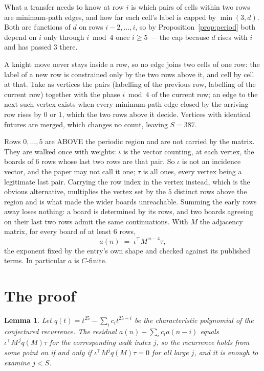 \documentclass[11pt,a4paper]{article}
\theoremstyle{plain}
\newtheorem{lemma}[theorem]{Lemma}
\theoremstyle{definition}
\begin{document}
What a transfer needs to know at row $i$ is which pairs of cells within two rows are minimum-path edges, and how far each cell's label is capped by $\min(3,d)$. Both are functions of $d$ on rows $i-2,\dots,i$, so by Proposition~\ref{prop:period} both depend on $i$ only through $i\bmod 4$ once $i\ge5$ --- the cap because $d$ rises with $i$ and has passed $3$ there.

A knight move never stays inside a row, so no edge joins two cells of one row: the label of a new row is constrained only by the two rows above it, and cell by cell at that. Take as vertices the pairs (labelling of the previous row, labelling of the current row) together with the phase $i\bmod 4$ of the current row; an edge to the next such vertex exists when every minimum-path edge closed by the arriving row rises by $0$ or $1$, which the two rows above it decide. Vertices with identical futures are merged, which changes no count, leaving $S=387$.

Rows $0,\dots,5$ are ABOVE the periodic region and are not carried by the matrix. They are walked once with weights: $\iota$ is the vector counting, at each vertex, the boards of $6$ rows whose last two rows are that pair. So $\iota$ is not an incidence vector, and the paper may not call it one; $\tau$ is all ones, every vertex being a legitimate last pair. Carrying the row index in the vertex instead, which is the obvious alternative, multiplies the vertex set by the $5$ distinct rows above the region and is what made the wider boards unreachable. Summing the early rows away loses nothing: a board is determined by its rows, and two boards agreeing on their last two rows admit the same continuations. With $M$ the adjacency matrix, for every board of at least $6$ rows,
\[
a(n)\;=\;\iota^{\!\top}M^{\,n-4}\tau ,
\]
the exponent fixed by the entry's own shape and checked against its published terms. In
particular $a$ is $C$-finite.

\section{The proof}

\begin{lemma}\label{lem:crit}
Let $q(t)=t^{25}-\sum_i c_it^{25-i}$ be the characteristic polynomial of the
conjectured recurrence. The residual $a(n)-\sum_ic_ia(n-i)$ equals
$\iota^{\!\top}M^{\,j}q(M)\tau$ for the corresponding walk index $j$, so the recurrence
holds from some point on if and only if $\iota^{\!\top}M^{j}q(M)\tau=0$ for all large $j$,
and it is enough to examine $j<S$.
\end{lemma}
\end{document}

